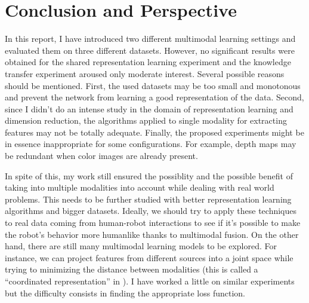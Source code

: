 \section{Conclusion and Perspective} \label{section:conclusion}

In this report, I have introduced two different multimodal learning
settings and evaluated them on three different datasets.
However, no significant results were obtained for the shared
representation learning experiment and the knowledge transfer experiment
aroused only moderate interest.
Several possible reasons should be mentioned.
First, the used datasets may be too small and monotonous and
prevent the network from learning a good representation of the data.
Second, since I didn't do an intense study in the domain of
representation learning and dimension reduction, the algorithms
applied to single modality for extracting features may not be totally
adequate. Finally, the proposed experiments might be in essence
inappropriate for some configurations. For example, depth maps may be
redundant when color images are already present.

In spite of this, my work still ensured the possiblity and the possible
benefit of taking into multiple modalities into account while
dealing with real world problems. This needs to be further studied
with better representation learning algorithms and bigger datasets.
Ideally, we should try to apply these techniques to real
data coming from human-robot interactions to see if it's possible
to make the robot's behavior more humanlike thanks to multimodal fusion.
On the other hand, there are still many multimodal learning models
to be explored. For instance, we can project features from different
sources into a joint space while trying to minimizing the distance
between modalities (this is called a ``coordinated representation''
in \cite{T. Baltrusaitis 2017}). I have worked a little on similar
experiments but the difficulty consists in finding the appropriate
loss function.



